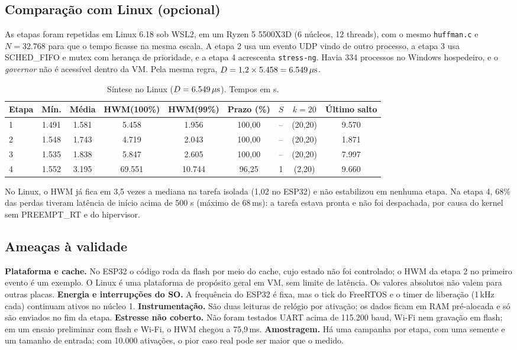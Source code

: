 \documentclass[11pt,a4paper]{article}
\newcommand{\us}{\ifmmode\,\mu\mathrm{s}\else\,\textmu s\fi}
\newcommand{\ms}{\,ms}
\begin{document}
\subsection{Comparação com Linux (opcional)}
\label{sec:linux}
As etapas foram repetidas em Linux 6.18 sob WSL2, em um Ryzen 5 5500X3D (6
núcleos, 12 threads), com o mesmo \texttt{huffman.c} e $N = 32.768$ para que o
tempo ficasse na mesma escala. A etapa 2 usa um evento UDP vindo de outro
processo, a etapa 3 usa SCHED\_FIFO e mutex com herança de prioridade, e a
etapa 4 acrescenta \texttt{stress-ng}. Havia 334 processos no Windows
hospedeiro, e o \textit{governor} não é acessível dentro da VM. Pela mesma
regra, $D = 1{,}2 \times 5.458 = 6.549\us$.

\begin{table}[H]
\centering
\caption{Síntese no Linux ($D = 6.549\us$). Tempos em \textmu s.}
\label{tab:linux}
\footnotesize
\setlength{\tabcolsep}{4pt}
\begin{tabular}{@{}lcccccccc@{}}
\toprule
Etapa & Mín. & Média & HWM(100\%) & HWM(99\%) & Prazo (\%) & $S$ & $k{=}20$ & Último salto \\
\midrule
1 & 1.491 & 1.581 & 5.458  & 1.956  & 100,00 & -- & (20,20) & 9.570 \\
2 & 1.548 & 1.743 & 4.719  & 2.043  & 100,00 & -- & (20,20) & 1.871 \\
3 & 1.535 & 1.838 & 5.847  & 2.605  & 100,00 & -- & (20,20) & 7.997 \\
4 & 1.552 & 3.195 & 69.551 & 10.744 & 96,25  & 1  & (2,20)  & 9.660 \\
\bottomrule
\end{tabular}
\end{table}

No Linux, o HWM já fica em 3,5 vezes a mediana na tarefa isolada (1,02 no
ESP32) e não estabilizou em nenhuma etapa. Na etapa 4, 68\% das perdas tiveram
latência de início acima de 500\us{} (máximo de 68\ms): a tarefa estava pronta
e não foi despachada, por causa do kernel sem PREEMPT\_RT e do hipervisor.

\subsection{Ameaças à validade}
\textbf{Plataforma e cache.} No ESP32 o código roda da flash por meio do cache,
cujo estado não foi controlado; o HWM da etapa 2 no primeiro evento é um
exemplo. O Linux é uma plataforma de propósito geral em VM, sem limite de
latência. Os valores absolutos não valem para outras placas.
\textbf{Energia e interrupções do SO.} A frequência do ESP32 é fixa, mas o tick
do FreeRTOS e o timer de liberação (1\,kHz cada) continuam ativos no núcleo 1.
\textbf{Instrumentação.} São duas leituras de relógio por ativação; os dados
ficam em RAM pré-alocada e só são enviados no fim da etapa.
\textbf{Estresse não coberto.} Não foram testados UART acima de 115.200 baud,
Wi-Fi nem gravação em flash; em um ensaio preliminar com flash e Wi-Fi, o HWM
chegou a 75,9\ms. \textbf{Amostragem.} Há uma campanha por etapa, com uma
semente e um tamanho de entrada; com 10.000 ativações, o pior caso real pode
ser maior que o medido.
\end{document}
